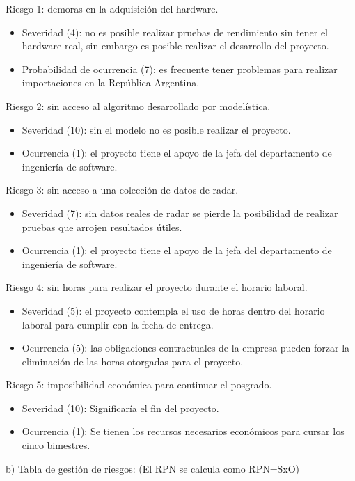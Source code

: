 \documentclass[
11pt, %
]{charter}
\begin{document}
Riesgo 1: demoras en la adquisición del hardware.
\begin{itemize}
\item Severidad (4): no es posible realizar pruebas de rendimiento sin tener el
  hardware real, sin embargo es posible realizar el desarrollo del proyecto.
\item Probabilidad de ocurrencia (7): es frecuente tener problemas para realizar
  importaciones en la República Argentina. 
\end{itemize}   

Riesgo 2: sin acceso al algoritmo desarrollado por modelística.
\begin{itemize}
\item Severidad (10): sin el modelo no es posible realizar el proyecto.
\item Ocurrencia (1): el proyecto tiene el apoyo de la jefa del departamento de
  ingeniería de software.
\end{itemize}

Riesgo 3: sin acceso a una colección de datos de radar.
\begin{itemize}
\item Severidad (7): sin datos reales de radar se pierde la posibilidad
  de realizar pruebas que arrojen resultados útiles.
\item Ocurrencia (1): el proyecto tiene el apoyo de la jefa del departamento de
  ingeniería de software.
\end{itemize}

Riesgo 4: sin horas para realizar el proyecto durante el horario laboral.
\begin{itemize}
\item Severidad (5): el proyecto contempla el uso de horas dentro del horario
  laboral para cumplir con la fecha de entrega.
\item Ocurrencia (5): las obligaciones contractuales de la empresa pueden forzar
  la eliminación de las horas otorgadas para el proyecto.
\end{itemize}

Riesgo 5: imposibilidad económica para continuar el posgrado.
\begin{itemize}
\item Severidad (10): Significaría el fin del proyecto.
\item Ocurrencia (1): Se tienen los recursos necesarios económicos para cursar
  los cinco bimestres.
\end{itemize}


b) Tabla de gestión de riesgos:      (El RPN se calcula como RPN=SxO)
\end{document}
